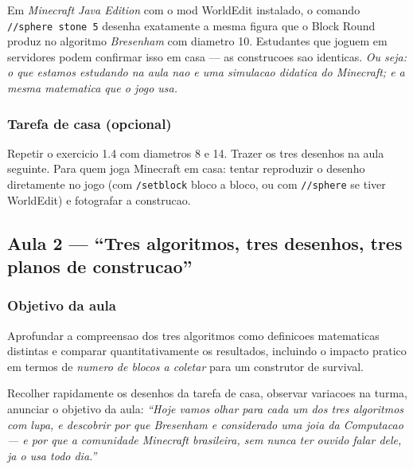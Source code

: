 \documentclass[12pt,a4paper]{scrartcl}
\newcommand{\cmd}[1]{\textcolor{earth}{\texttt{\small #1}}}
\newcommand{\tempo}[1]{\textnormal{\footnotesize\color{bg!90!white}\textsf{#1}}}
\begin{document}
\begin{minec}
Em \emph{Minecraft Java Edition} com o mod WorldEdit instalado, o comando \cmd{//sphere stone 5} desenha exatamente a mesma figura que o Block Round produz no algoritmo \emph{Bresenham} com diametro 10. Estudantes que joguem em servidores podem confirmar isso em casa --- as construcoes sao identicas. \emph{Ou seja: o que estamos estudando na aula nao e uma simulacao didatica do Minecraft; e a mesma matematica que o jogo usa.}
\end{minec}

\subsubsection*{Tarefa de casa (opcional)}
Repetir o exercicio 1.4 com diametros 8 e 14. Trazer os tres desenhos na aula seguinte. Para quem joga Minecraft em casa: tentar reproduzir o desenho diretamente no jogo (com \cmd{/setblock} bloco a bloco, ou com \cmd{//sphere} se tiver WorldEdit) e fotografar a construcao.

\subsection{Aula 2 --- \enquote{Tres algoritmos, tres desenhos, tres planos de construcao}}\label{aula2}

\subsubsection*{Objetivo da aula}
Aprofundar a compreensao dos tres algoritmos como definicoes matematicas distintas e comparar quantitativamente os resultados, incluindo o impacto pratico em termos de \emph{numero de blocos a coletar} para um construtor de survival.

\begin{atividade}[2.1 --- Retomada \quad\tempo{5 min}]
Recolher rapidamente os desenhos da tarefa de casa, observar variacoes na turma, anunciar o objetivo da aula: \emph{\enquote{Hoje vamos olhar para cada um dos tres algoritmos com lupa, e descobrir por que Bresenham e considerado uma joia da Computacao --- e por que a comunidade Minecraft brasileira, sem nunca ter ouvido falar dele, ja o usa todo dia.}}
\end{atividade}
\end{document}
